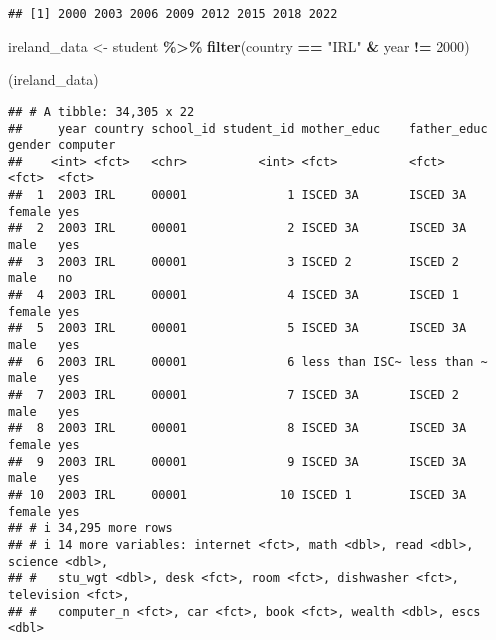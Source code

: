 \documentclass[
]{article}
\newenvironment{Shaded}{\begin{snugshade}}{\end{snugshade}}
\newcommand{\DecValTok}[1]{\textcolor[rgb]{0.00,0.00,0.81}{#1}}
\newcommand{\FunctionTok}[1]{\textcolor[rgb]{0.13,0.29,0.53}{\textbf{#1}}}
\newcommand{\NormalTok}[1]{#1}
\newcommand{\OtherTok}[1]{\textcolor[rgb]{0.56,0.35,0.01}{#1}}
\newcommand{\SpecialCharTok}[1]{\textcolor[rgb]{0.81,0.36,0.00}{\textbf{#1}}}
\newcommand{\StringTok}[1]{\textcolor[rgb]{0.31,0.60,0.02}{#1}}
\begin{document}
\begin{verbatim}
## [1] 2000 2003 2006 2009 2012 2015 2018 2022
\end{verbatim}

\begin{Shaded}
\begin{Highlighting}[]
\NormalTok{ireland\_data }\OtherTok{\textless{}{-}}\NormalTok{ student }\SpecialCharTok{\%\textgreater{}\%}
  \FunctionTok{filter}\NormalTok{(country }\SpecialCharTok{==} \StringTok{"IRL"} \SpecialCharTok{\&}\NormalTok{ year }\SpecialCharTok{!=} \DecValTok{2000}\NormalTok{)}


\NormalTok{(ireland\_data)}
\end{Highlighting}
\end{Shaded}

\begin{verbatim}
## # A tibble: 34,305 x 22
##     year country school_id student_id mother_educ    father_educ gender computer
##    <int> <fct>   <chr>          <int> <fct>          <fct>       <fct>  <fct>   
##  1  2003 IRL     00001              1 ISCED 3A       ISCED 3A    female yes     
##  2  2003 IRL     00001              2 ISCED 3A       ISCED 3A    male   yes     
##  3  2003 IRL     00001              3 ISCED 2        ISCED 2     male   no      
##  4  2003 IRL     00001              4 ISCED 3A       ISCED 1     female yes     
##  5  2003 IRL     00001              5 ISCED 3A       ISCED 3A    male   yes     
##  6  2003 IRL     00001              6 less than ISC~ less than ~ male   yes     
##  7  2003 IRL     00001              7 ISCED 3A       ISCED 2     male   yes     
##  8  2003 IRL     00001              8 ISCED 3A       ISCED 3A    female yes     
##  9  2003 IRL     00001              9 ISCED 3A       ISCED 3A    male   yes     
## 10  2003 IRL     00001             10 ISCED 1        ISCED 3A    female yes     
## # i 34,295 more rows
## # i 14 more variables: internet <fct>, math <dbl>, read <dbl>, science <dbl>,
## #   stu_wgt <dbl>, desk <fct>, room <fct>, dishwasher <fct>, television <fct>,
## #   computer_n <fct>, car <fct>, book <fct>, wealth <dbl>, escs <dbl>
\end{verbatim}

\begin{Shaded}
\end{Shaded}
\end{document}
